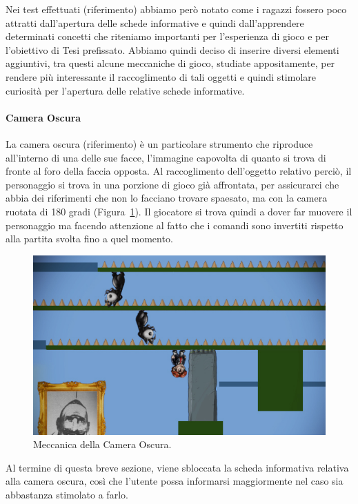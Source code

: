 Nei test effettuati (riferimento) abbiamo però notato come i ragazzi fossero poco attratti dall’apertura delle schede informative e quindi dall’apprendere determinati concetti che riteniamo importanti per l’esperienza di gioco e per l’obiettivo di Tesi prefissato.
Abbiamo quindi deciso di inserire diversi elementi aggiuntivi, tra questi alcune meccaniche di gioco, studiate appositamente, per rendere più interessante il raccoglimento di tali oggetti e quindi stimolare curiosità per l’apertura delle relative schede informative.

\paragraph{Camera Oscura}
\label{par_meccanica_camera_oscura}
La camera oscura (riferimento) è un particolare strumento che riproduce all’interno di una delle sue facce, l’immagine capovolta di quanto si trova di fronte al foro della faccia opposta.
Al raccoglimento dell’oggetto relativo perciò, il personaggio si trova in una porzione di gioco già affrontata, per assicurarci che abbia dei riferimenti che non lo facciano trovare spaesato, ma con la camera ruotata di 180 gradi (Figura~\ref{fig:meccaniche_precinema_camera_oscura}). Il giocatore si trova quindi a dover far muovere il personaggio ma facendo attenzione al fatto che i comandi sono invertiti rispetto alla partita svolta fino a quel momento.

\begin{figure}%
	\centering
	\includegraphics[width= 0.8\columnwidth]{images/gameDesign/23_cameraOscura.jpg}
	\caption{Meccanica della Camera Oscura.}
	\label{fig:meccaniche_precinema_camera_oscura}
\end{figure} 

Al termine di questa breve sezione, viene sbloccata la scheda informativa relativa alla camera oscura, così che l’utente possa informarsi maggiormente nel caso sia abbastanza stimolato a farlo.

